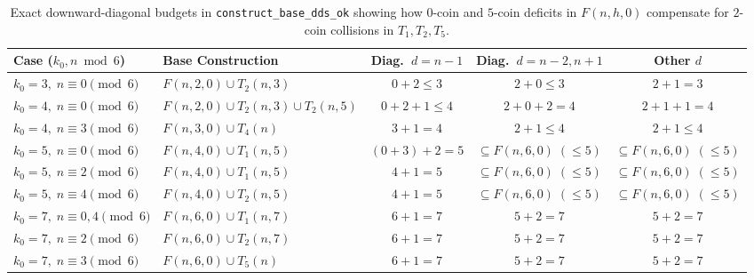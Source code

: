 \documentclass[11pt,a4paper]{article}
\theoremstyle{remark}
\begin{document}
\begin{table}[ht!]
\centering
\footnotesize
\renewcommand{\arraystretch}{1.25}
\begin{tabular}{@{}llccc@{}}
\toprule
\textbf{Case ($k_0, n \bmod 6$)} & \textbf{Base Construction} & \textbf{Diag.\ $d = n - 1$} & \textbf{Diag.\ $d = n - 2, n + 1$} & \textbf{Other $d$} \\
\midrule
$k_0 = 3,\; n \equiv 0 \pmod 6$ & $F(n,2,0) \cup T_2(n,3)$ & $0 + 2 \le 3$ & $2 + 0 \le 3$ & $2 + 1 = 3$ \\
$k_0 = 4,\; n \equiv 0 \pmod 6$ & $F(n,2,0) \cup T_2(n,3) \cup T_2(n,5)$ & $0 + 2 + 1 \le 4$ & $2 + 0 + 2 = 4$ & $2 + 1 + 1 = 4$ \\
$k_0 = 4,\; n \equiv 3 \pmod 6$ & $F(n,3,0) \cup T_4(n)$ & $3 + 1 = 4$ & $2 + 1 \le 4$ & $2 + 1 \le 4$ \\
$k_0 = 5,\; n \equiv 0 \pmod 6$ & $F(n,4,0) \cup T_1(n,5)$ & $(0 + 3) + 2 = 5$ & $\subseteq F(n,6,0)\; (\le 5)$ & $\subseteq F(n,6,0)\; (\le 5)$ \\
$k_0 = 5,\; n \equiv 2 \pmod 6$ & $F(n,4,0) \cup T_1(n,5)$ & $4 + 1 = 5$ & $\subseteq F(n,6,0)\; (\le 5)$ & $\subseteq F(n,6,0)\; (\le 5)$ \\
$k_0 = 5,\; n \equiv 4 \pmod 6$ & $F(n,4,0) \cup T_2(n,5)$ & $4 + 1 = 5$ & $\subseteq F(n,6,0)\; (\le 5)$ & $\subseteq F(n,6,0)\; (\le 5)$ \\
$k_0 = 7,\; n \equiv 0,4 \pmod 6$ & $F(n,6,0) \cup T_1(n,7)$ & $6 + 1 = 7$ & $5 + 2 = 7$ & $5 + 2 = 7$ \\
$k_0 = 7,\; n \equiv 2 \pmod 6$ & $F(n,6,0) \cup T_2(n,7)$ & $6 + 1 = 7$ & $5 + 2 = 7$ & $5 + 2 = 7$ \\
$k_0 = 7,\; n \equiv 3 \pmod 6$ & $F(n,6,0) \cup T_5(n)$ & $6 + 1 = 7$ & $5 + 2 = 7$ & $5 + 2 = 7$ \\
\bottomrule
\end{tabular}
\caption{Exact downward-diagonal budgets in \texttt{construct\_base\_dds\_ok} showing how $0$-coin and $5$-coin deficits in $F(n,h,0)$ compensate for $2$-coin collisions in $T_1, T_2, T_5$.}
\label{tab:cancellation}
\end{table}
\end{document}
